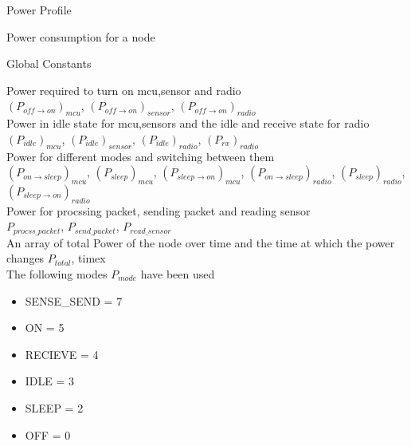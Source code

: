 \documentclass{article}
\begin{document}
\centerline{\sc \huge Power Profile}


\begin{center}
	\large{Power consumption for a node}
\end{center}

\begin{center}
	Global Constants
\end{center}

Power required to turn on mcu,sensor and radio \\
$(P_{off \to on})_{mcu}$,
$(P_{off \to on})_{sensor}$,
$(P_{off \to on})_{radio}$
\\

Power in idle state for mcu,sensors and the idle and receive state for radio \\
$(P_{idle})_{mcu}$,
$(P_{idle})_{sensor}$,
$(P_{idle})_{radio}$,
$(P_{rx})_{radio}$
\\

Power for different modes and switching between them \\
$(P_{on \to sleep})_{mcu}$,
$(P_{sleep})_{mcu}$,
$(P_{sleep \to on})_{mcu}$,
$(P_{on \to sleep})_{radio}$,
$(P_{sleep})_{radio}$,
$(P_{sleep \to on})_{radio}$
\\

Power for procssing packet, sending packet and reading sensor \\
$P_{procss\_packet}$,
$P_{send\_packet}$,
$P_{read\_sensor}$
\\

An array of total Power of the node over time and the time at which the power changes
$P_{total}$, timex
\\

The following modes $P_{mode}$ have been used
\begin{itemize}
	\item SENSE\_SEND = 7
	\item ON = 5
	\item RECIEVE = 4
	\item IDLE = 3
	\item SLEEP = 2
	\item OFF = 0
\end{itemize}
\end{document}
